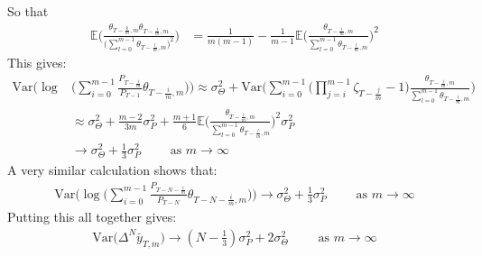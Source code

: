 So that
\begin{align*}
  \mathbb{E} \Bigg( \frac{\theta_{T-\frac{k}{m},m} \theta_{T-\frac{i}{m},m}}{\Big( \sum_{l=0}^{m-1} \theta_{T-\frac{l}{m},m} \Big)^2} \Bigg) &= \frac{1}{m(m-1)} -\frac{1}{m-1} \mathbb{E} \Bigg( \frac{\theta_{T-\frac{i}{m},m}}{\sum_{l=0}^{m-1} \theta_{T-\frac{l}{m},m}} \Bigg)^2
\end{align*}
This gives:
\begin{align*}
 \mathrm{Var}\Bigg(\log &\Bigg(\sum_{i=0}^{m-1} \frac{P_{T-\frac{i}{m}}}{P_{T-1}} \theta_{T-\frac{i}{m},m} \Bigg) \Bigg)
\approx \sigma^2_{\Theta} + \mathrm{Var}\Bigg( \sum_{i=0}^{m-1} \Big(\prod_{j=i}^{m-1} \zeta_{T-\frac{j}{m}}   -1\Big) \frac{\theta_{T-\frac{i}{m},m}}{\sum_{l=0}^{m-1} \theta_{T-\frac{l}{m},m}} \Bigg) \\
&\approx \sigma^2_{\Theta} +  \frac{m-2}{3m} \sigma^2_P +  \frac{m+1}{6}\mathbb{E} \Bigg(\frac{\theta_{T-\frac{i}{m},m}}{\sum_{l=0}^{m-1} \theta_{T-\frac{l}{m},m}} \Bigg)^2 \sigma^2_P \\
& \rightarrow \sigma^2_{\Theta} +  \frac{1}{3} \sigma^2_P \qquad \text{  as } m\rightarrow \infty
\end{align*}
A very similar calculation shows that:
\begin{align*}
\mathrm{Var}\Bigg(\log\Bigg(\sum_{i=0}^{m-1}\frac{ P_{T-N-\frac{i}{m}}}{P_{T-N}} \theta_{T-N-\frac{i}{m},m}\Bigg) \Bigg) \rightarrow \sigma^2_{\Theta} +  \frac{1}{3} \sigma^2_P \qquad \text{  as } m\rightarrow \infty
\end{align*}
Putting this all together gives:
\begin{align*}
\mathrm{Var}\Big(\Delta^N \bar{y}_{T,m}\Big)  \rightarrow (N-\frac{1}{3})\sigma^2_P + 2\sigma^2_{\Theta} \qquad \text{  as } m\rightarrow \infty
\end{align*}






